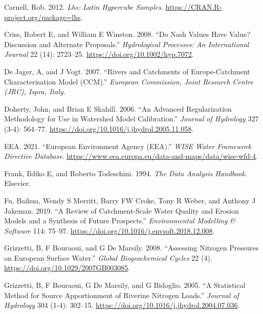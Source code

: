 \begin{CSLReferences}{1}{0}
\leavevmode{}%
Carnell, Rob. 2012. \emph{Lhs: Latin Hypercube Samples}. \url{https://CRAN.R-project.org/package=lhs}.

\leavevmode{}%
Criss, Robert E, and William E Winston. 2008. {``Do Nash Values Have Value? Discussion and Alternate Proposals.''} \emph{Hydrological Processes: An International Journal} 22 (14): 2723--25. \url{https://doi.org/10.1002/hyp.7072}.

\leavevmode{}%
De Jager, A, and J Vogt. 2007. {``Rivers and Catchments of Europe-Catchment Characterisation Model (CCM).''} \emph{European Commission, Joint Research Centre (JRC), Ispra, Italy}.

\leavevmode{}%
Doherty, John, and Brian E Skahill. 2006. {``An Advanced Regularization Methodology for Use in Watershed Model Calibration.''} \emph{Journal of Hydrology} 327 (3-4): 564--77. \url{https://doi.org/10.1016/j.jhydrol.2005.11.058}.

\leavevmode{}%
EEA. 2021. {``{European Environment Agency (EEA)}.''} \emph{WISE Water Framework Directive Database}. \url{https://www.eea.europa.eu/data-and-maps/data/wise-wfd-4}.

\leavevmode{}%
Frank, Ildiko E, and Roberto Todeschini. 1994. \emph{The Data Analysis Handbook}. Elsevier.

\leavevmode{}%
Fu, Baihua, Wendy S Merritt, Barry FW Croke, Tony R Weber, and Anthony J Jakeman. 2019. {``A Review of Catchment-Scale Water Quality and Erosion Models and a Synthesis of Future Prospects.''} \emph{Environmental Modelling \& Software} 114: 75--97. \url{https://doi.org/10.1016/j.envsoft.2018.12.008}.

\leavevmode{}%
Grizzetti, B, F Bouraoui, and G De Marsily. 2008. {``Assessing Nitrogen Pressures on European Surface Water.''} \emph{Global Biogeochemical Cycles} 22 (4). \url{https://doi.org/10.1029/2007GB003085}.

\leavevmode{}%
Grizzetti, B, F Bouraoui, G De Marsily, and G Bidoglio. 2005. {``A Statistical Method for Source Apportionment of Riverine Nitrogen Loads.''} \emph{Journal of Hydrology} 304 (1-4): 302--15. \url{https://doi.org/10.1016/j.jhydrol.2004.07.036}.


\end{CSLReferences}
